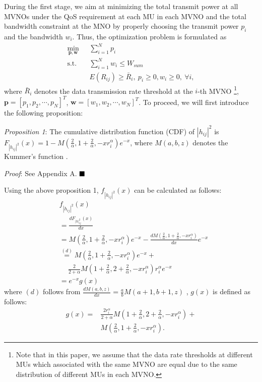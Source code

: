 \documentclass[journal]{IEEEtran}
\begin{document}
During the first stage, we aim at minimizing the total transmit power at all MVNOs under the QoS requirement at each MU in each MVNO and the total bandwidth constraint at the MNO by properly choosing the transmit power $p_i$ and the bandwidth $w_i$. Thus, the optimization problem is formulated as
\begin{subequations}\label{q4}
	\begin{align}
	\min_{\mathbf{p}, \mathbf{w}}\ & \sum\limits_{i = 1}^{N} p_i \\ \mbox{s.t.} \quad &  \sum\limits_{i = 1}^{N} w_i \leq W_{sum}\\ \quad &  E\left({R}_{ij}\right) \geq \bar{R}_i, \ p_i \geq 0, w_i \geq 0, \ \forall i, 
	\end{align}
\end{subequations}
where $\bar{R}_i$ denotes the data transmission rate threshold at the $i$-th MVNO  \footnote{Note that in this paper, we assume that the data rate thresholds at different MUs which associated with the same MVNO are equal due to the same distribution of different MUs in each MVNO.}, $\mathbf{p} = \left[p_1, p_2, \cdots, p_N\right]^T$, $\mathbf{w} = \left[w_1, w_2, \cdots, w_N\right]^T$. To proceed, we will first introduce the following proposition:

\textit{Proposition 1}: The cumulative distribution function (CDF) of $\left|h_{ij} \right|^2$ is $F_{\left|h_{ij} \right|^2}\left(x\right) = 1 - M\left(\frac{2}{\alpha}, 1 + \frac{2}{\alpha}, - x r_i^{\alpha}\right)e^{-x}$, where $M\left(a,b,z\right)$ denotes the Kummer's function \cite{MAbramowitz}.


\textit{Proof}: See Appendix A.  $\hfill\blacksquare$

Using the above proposition 1, $f_{\left|h_{ij} \right|^2} \left(x\right)$ can be calculated as follows:
\begin{align}
&f_{\left|h_{ij} \right|^2} \left(x\right)\nonumber \\ &= \frac{d F_{\left|h\right|_{ij}^2}\left(x\right)}{d x} \nonumber \\
&=M\left(\frac{2}{\alpha}, 1 + \frac{2}{\alpha}, -xr_i^{\alpha}\right)e^{-x} -\frac{d M\left(\frac{2}{\alpha}, 1 + \frac{2}{\alpha}, -x r_i^{\alpha}\right)}{d x} e^{-x} \nonumber \\
&\overset{\left(d\right)}{=} M\left(\frac{2}{\alpha}, 1 + \frac{2}{\alpha}, -xr_i^{\alpha}\right)e^{-x} + \nonumber \\ & \quad \ \frac{2}{2+\alpha}M\left(1 + \frac{2}{\alpha}, 2+\frac{2}{\alpha}, -xr_i^{\alpha}\right)r_i^{\alpha}e^{-x} \nonumber \\
& = e^{-x}g\left(x\right)
\end{align}
where $\left(d\right)$ follows from $\frac{d M\left(a, b, z\right)}{d x} = \frac{a}{b}M\left(a+1, b+1, z\right)$ \cite[13.4.8]{MAbramowitz}, $g\left(x\right)$ is defined as follows:
\begin{align}
g\left(x\right) =& \frac{2r_i^{\alpha}}{2+\alpha} M\left(1 + \frac{2}{\alpha}, 2+ \frac{2}{\alpha}, -xr_i^{\alpha}\right) + \nonumber \\ & M\left(\frac{2}{\alpha}, 1 + \frac{2}{\alpha}, -xr_i^{\alpha}\right).
\end{align}
\end{document}

